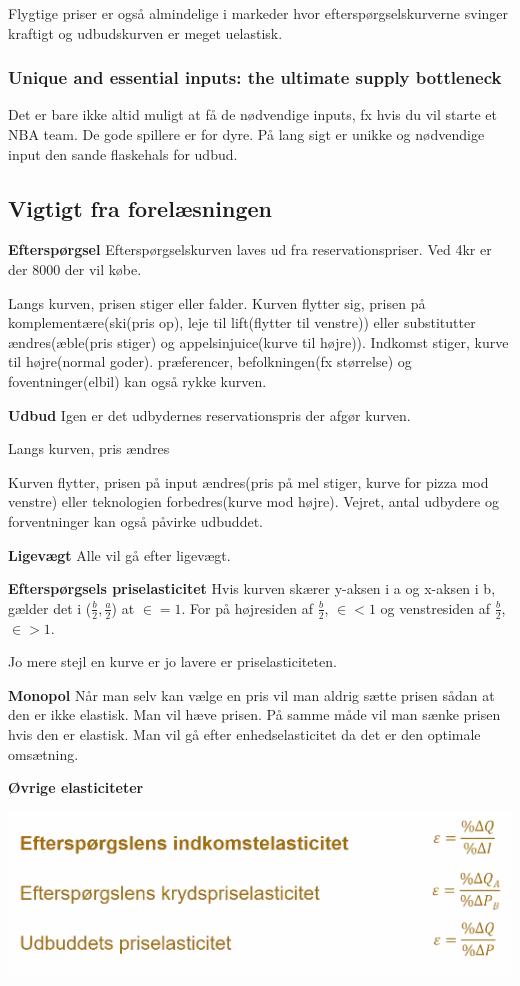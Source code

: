 Flygtige priser er også almindelige i markeder hvor efterspørgselskurverne svinger kraftigt og udbudskurven er meget uelastisk.

\subsubsection{Unique and essential inputs: the ultimate supply bottleneck}
Det er bare ikke altid muligt at få de nødvendige inputs, fx hvis du vil starte et NBA team. De gode spillere er for dyre. På lang sigt er unikke og nødvendige input den sande flaskehals for udbud. 

\subsection{Vigtigt fra forelæsningen}
\textbf{Efterspørgsel}
Efterspørgselskurven laves ud fra reservationspriser. Ved 4kr er der 8000 der vil købe.

Langs kurven, prisen stiger eller falder. 
Kurven flytter sig, prisen på komplementære(ski(pris op), leje til lift(flytter til venstre)) eller substitutter ændres(æble(pris stiger) og appelsinjuice(kurve til højre)). Indkomst stiger, kurve til højre(normal goder). præferencer, befolkningen(fx størrelse) og foventninger(elbil) kan også rykke kurven.

\textbf{Udbud}
Igen er det udbydernes reservationspris der afgør kurven. 

Langs kurven, pris ændres

Kurven flytter, prisen på input ændres(pris på mel stiger, kurve for pizza mod venstre) eller teknologien forbedres(kurve mod højre). Vejret, antal udbydere og forventninger kan også påvirke udbuddet.

\textbf{Ligevægt}
Alle vil gå efter ligevægt.

\textbf{Efterspørgsels priselasticitet}
Hvis kurven skærer y-aksen i a og x-aksen i b, gælder det i ($\frac{b}{2}, \frac{a}{2}$) at $\in = 1$. For på højresiden af $\frac{b}{2}$, $\in<1$ og venstresiden af $\frac{b}{2}$, $\in>1$.

Jo mere stejl en kurve er jo lavere er priselasticiteten. 

\textbf{Monopol}
Når man selv kan vælge en pris vil man aldrig sætte prisen sådan at den er ikke elastisk. Man vil hæve prisen. På samme måde vil man sænke prisen hvis den er elastisk. Man vil gå efter enhedselasticitet da det er den optimale omsætning. 

\textbf{Øvrige elasticiteter}

\includegraphics[scale=0.8]{Afsnit/Lektion1/andre.png}


















